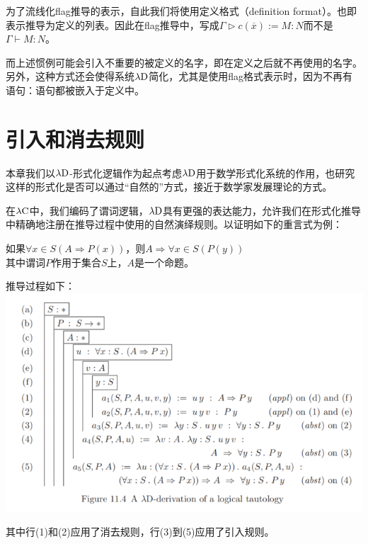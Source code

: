 \documentclass[UTF8]{article}
\begin{document}
		为了流线化flag推导的表示，自此我们将使用定义格式（definition format）。也即表示推导为定义的列表。因此在flag推导中，写成$\Gamma\triangleright c(\overline{x}):=M:N$而不是$\Gamma\vdash M:N$。
		
		而上述惯例可能会引入不重要的被定义的名字，即在定义之后就不再使用的名字。另外，这种方式还会使得系统$\lambda{\rm D}$简化，尤其是使用flag格式表示时，因为不再有语句：语句都被嵌入于定义中。
		
	\section{引入和消去规则}
	\noindent
	本章我们以$\lambda{\rm D}$-形式化逻辑作为起点考虑$\lambda{\rm D}$用于数学形式化系统的作用，也研究这样的形式化是否可以通过“自然的”方式，接近于数学家发展理论的方式。
	
		在$\lambda{\rm C}$中，我们编码了谓词逻辑，$\lambda{\rm D}$具有更强的表达能力，允许我们在形式化推导中精确地注册在推导过程中使用的自然演绎规则。以证明如下的重言式为例：
		
		如果$\forall{x\in S}(A\Rightarrow P(x))$，则$A\Rightarrow\forall{x\in S}(P(y))$\\
		其中谓词$P$作用于集合$S$上，$A$是一个命题。
		
		推导过程如下：\\
		\includegraphics[width=0.93\linewidth]{"../imgs/11-5.png"}
		
		其中行(1)和(2)应用了消去规则，行(3)到(5)应用了引入规则。
\end{document}
